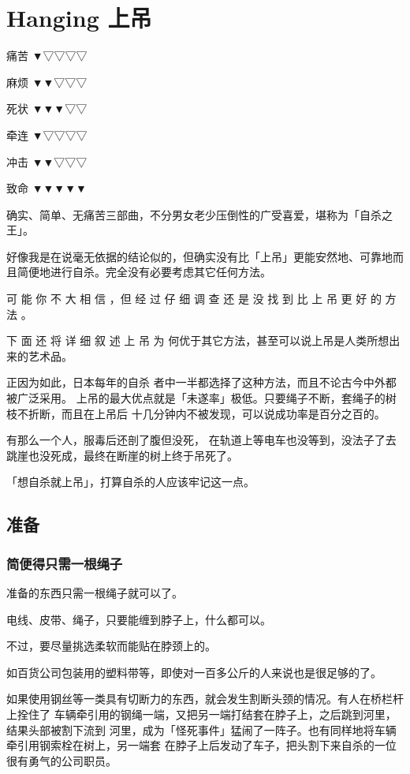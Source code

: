 \documentclass[UTF8]{ctexart}
\begin{document}
\newpage

\section{Hanging 上吊}

痛苦 ▼▽▽▽▽

麻烦 ▼▼▽▽▽

死状 ▼▼▼▽▽

牵连 ▼▽▽▽▽

冲击 ▼▼▽▽▽

致命 ▼▼▼▼▼

确实、简单、无痛苦三部曲，不分男女老少压倒性的广受喜爱，堪称为「自杀之王」。

好像我是在说毫无依据的结论似的，但确实没有比「上吊」更能安然地、可靠地而且简便地进行自杀。完全没有必要考虑其它任何方法。

可 能 你 不 大 相 信 ，但 经 过 仔 细 调 查 还 是 没 找 到 比 上 吊 更 好 的 方 法 。

下 面 还 将 详 细 叙 述 上 吊 为 何优于其它方法，甚至可以说上吊是人类所想出来的艺术品。

正因为如此，日本每年的自杀 者中一半都选择了这种方法，而且不论古今中外都被广泛采用。 上吊的最大优点就是「未遂率」极低。只要绳子不断，套绳子的树枝不折断，而且在上吊后 十几分钟内不被发现，可以说成功率是百分之百的。

有那么一个人，服毒后还剖了腹但没死， 在轨道上等电车也没等到，没法子了去跳崖也没死成，最终在断崖的树上终于吊死了。

「想自杀就上吊」，打算自杀的人应该牢记这一点。

\subsection{准备}

\subsubsection*{简便得只需一根绳子}

准备的东西只需一根绳子就可以了。

电线、皮带、绳子，只要能缠到脖子上，什么都可以。

不过，要尽量挑选柔软而能贴在脖颈上的。

如百货公司包装用的塑料带等，即使对一百多公斤的人来说也是很足够的了。

如果使用钢丝等一类具有切断力的东西，就会发生割断头颈的情况。有人在桥栏杆上拴住了
车辆牵引用的钢绳一端，又把另一端打结套在脖子上，之后跳到河里，结果头部被割下流到
河里，成为「怪死事件」猛闹了一阵子。也有同样地将车辆牵引用钢索栓在树上，另一端套
在脖子上后发动了车子，把头割下来自杀的一位很有勇气的公司职员。
\end{document}
